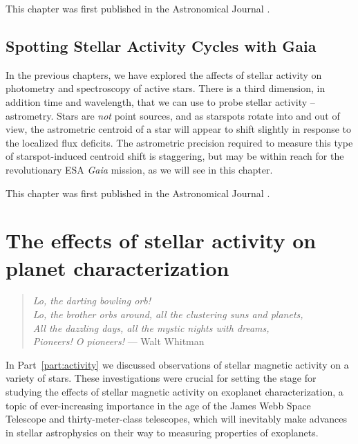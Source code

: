 \documentclass[12pt, twoside]{uwthesis}
\newcommand{\gaia}{\textit{Gaia}\xspace}
\begin{document}
This chapter was first published in the Astronomical Journal \citep{Morris2018c}.



\chapter{Spotting Stellar Activity Cycles with Gaia} \label{chap:gaia}

In the previous chapters, we have explored the affects of stellar activity on photometry and spectroscopy of active stars. There is a third dimension, in addition time and wavelength, that we can use to probe stellar activity -- astrometry. Stars are \textit{not} point sources, and as starspots rotate into and out of view, the astrometric centroid of a star will appear to shift slightly in response to the localized flux deficits. The astrometric precision required to measure this type of starspot-induced centroid shift is staggering, but may be within reach for the revolutionary ESA \gaia mission, as we will see in this chapter.

This chapter was first published in the Astronomical Journal \citep{Morris2018b}.



\part{The effects of stellar activity on planet characterization} \label{part:synthesis}

\begin{verse}
{\it Lo, the darting bowling orb!\\
Lo, the brother orbs around, all the clustering suns and planets,\\
All the dazzling days, all the mystic nights with dreams,\\
Pioneers! O pioneers!}
\hfill --- Walt Whitman
\end{verse}

In Part~\ref{part:activity} we discussed observations of stellar magnetic activity on a variety of stars. These investigations were crucial for setting the stage for studying the effects of stellar magnetic activity on exoplanet characterization, a topic of ever-increasing importance in the age of the James Webb Space Telescope and thirty-meter-class telescopes, which will inevitably make advances in stellar astrophysics on their way to measuring properties of exoplanets.  
\end{document}
